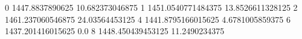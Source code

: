 0 1447.8837890625 10.682373046875
1 1451.0540771484375 13.8526611328125
2 1461.237060546875 24.03564453125
4 1441.8795166015625 4.6781005859375
6 1437.201416015625 0.0
8 1448.450439453125 11.2490234375
